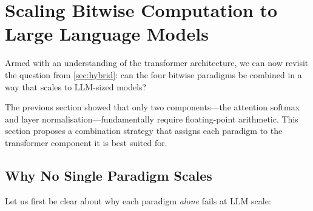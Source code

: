 \section{Scaling Bitwise Computation to Large Language Models}
\label{sec:scaling-llms}

Armed with an understanding of the transformer architecture, we can
now revisit the question from \cref{sec:hybrid}: can the four bitwise
paradigms be combined in a way that scales to LLM-sized models?

The previous section showed that only two components---the attention
softmax and layer normalisation---fundamentally require floating-point
arithmetic. This section proposes a combination strategy that assigns
each paradigm to the transformer component it is best suited for.

\subsection{Why No Single Paradigm Scales}
\label{sec:why-no-single}

Let us first be clear about why each paradigm \emph{alone} fails at
LLM scale:

